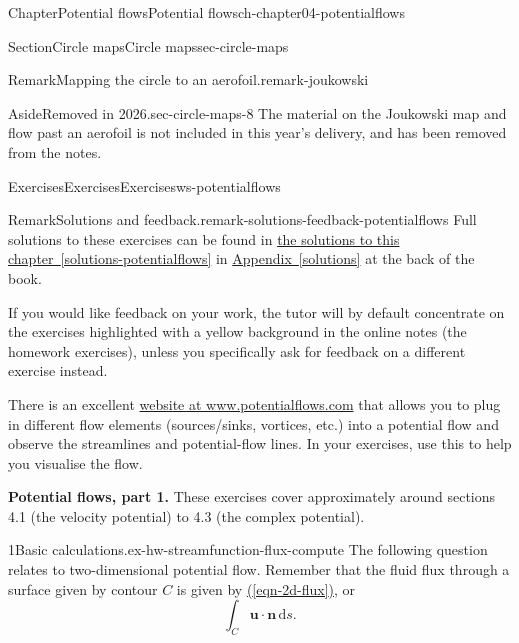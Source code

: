 \documentclass[oneside,10pt,]{book}
\newcommand{\xreffont}{\relax}
\numberwithin{equation}{section}
\newcommand{\de}{\mathrm{d}}
\newcommand{\bn}{\boldsymbol{n}}
\newcommand{\bu}{\boldsymbol{u}}
\begin{document}
\begin{chapterptx}{Chapter}{Potential flows}{}{Potential flows}{}{}{ch-chapter04-potentialflows}
\begin{sectionptx}{Section}{Circle maps}{}{Circle maps}{}{}{sec-circle-maps}
\begin{remark}{Remark}{Mapping the circle to an aerofoil.}{remark-joukowski}
\end{remark}
\begin{aside}{Aside}{Removed in 2026.}{sec-circle-maps-8}%
The material on the Joukowski map and flow past an aerofoil is not included in this year's delivery, and has been removed from the notes.%
\end{aside}
\end{sectionptx}
%
%
\typeout{************************************************}
\typeout{************************************************}
%
\begin{exercises-section}{Exercises}{Exercises}{}{Exercises}{}{}{ws-potentialflows}
\begin{introduction}{}%
\begin{remark}{Remark}{Solutions and feedback.}{remark-solutions-feedback-potentialflows}%
Full solutions to these exercises can be found in \hyperref[solutions-potentialflows]{the solutions to this chapter~{\xreffont\ref{solutions-potentialflows}}} in \hyperref[solutions]{Appendix~{\xreffont\ref{solutions}}} at the back of the book.%
\par
If you would like feedback on your work, the tutor will by default concentrate on the exercises highlighted with a yellow background in the online notes (the homework exercises), unless you specifically ask for feedback on a different exercise instead.%
\end{remark}
There is an excellent \href{https://potentialflow.com/}{website at www.potentialflows.com} that allows you to plug in different flow elements (sources\slash{}sinks, vortices, etc.) into a potential flow and observe the streamlines and potential-flow lines. In your exercises, use this to help you visualise the flow.%
\end{introduction}%
\par\medskip\noindent%
\textbf{Potential flows, part 1.}\space\space%
These exercises cover approximately around sections 4.1 (the velocity potential) to 4.3 (the complex potential).%
\begin{exercisegroup}
\begin{divisionexerciseeg}{1}{Basic calculations.}{}{ex-hw-streamfunction-flux-compute}%
The following question relates to two-dimensional potential flow.  Remember that the fluid flux through a surface given by contour \(C\) is given by \hyperref[eqn-2d-flux]{({\xreffont\ref{eqn-2d-flux}})}, or%
\begin{equation*}
\int_C \bu \cdot \bn \, \de{s}.
\end{equation*}

\end{divisionexerciseeg}
\end{exercisegroup}
\end{exercises-section}
\end{chapterptx}
\end{document}
